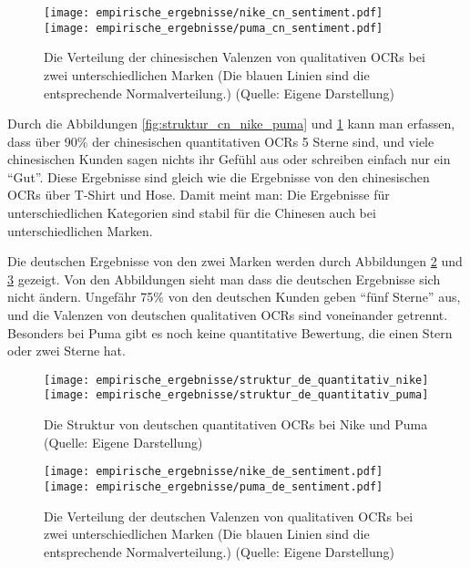\begin{figure}[h]
    \texttt{[image: empirische\_ergebnisse/nike\_cn\_sentiment.pdf]}
    \endminipage\hfill
    \texttt{[image: empirische\_ergebnisse/puma\_cn\_sentiment.pdf]}
    \endminipage 
    \caption[Die Verteilung der chinesischen Valenzen von qualitativen OCRs bei zwei unterschiedlichen Marken]{Die Verteilung der chinesischen Valenzen von qualitativen \ac{OCRs} bei zwei unterschiedlichen Marken (Die blauen Linien sind die entsprechende Normalverteilung.) (Quelle: Eigene Darstellung)}
    \label{fig:valenz_cn_marken}
\end{figure}

Durch die Abbildungen \ref{fig:struktur_cn_nike_puma} und \ref{fig:valenz_cn_marken} kann man erfassen, dass über 90\% der chinesischen quantitativen \ac{OCRs} 5 Sterne sind, und viele chinesischen Kunden sagen nichts ihr Gefühl aus oder schreiben einfach nur ein ``Gut''. Diese Ergebnisse sind gleich wie die Ergebnisse von den chinesischen \ac{OCRs} über T-Shirt und Hose. Damit meint man: Die Ergebnisse für unterschiedlichen Kategorien sind stabil für die Chinesen auch bei unterschiedlichen Marken.

Die deutschen Ergebnisse von den zwei Marken werden durch Abbildungen \ref{fig:struktur_de_nike_puma} und \ref{fig:valenz_de_marken} gezeigt. Von den Abbildungen sieht man dass die deutschen Ergebnisse sich nicht ändern. Ungefähr 75\% von den deutschen Kunden geben ``fünf Sterne'' aus, und die Valenzen von deutschen qualitativen \ac{OCRs} sind voneinander getrennt. Besonders bei Puma gibt es noch keine quantitative Bewertung, die einen Stern oder zwei Sterne hat.

\begin{figure}[htb]
    {\texttt{[image: empirische\_ergebnisse/struktur\_de\_quantitativ\_nike]}}    
    {\texttt{[image: empirische\_ergebnisse/struktur\_de\_quantitativ\_puma]}}   
    \caption[Die Struktur von deutschen quantitativen OCRs bei Nike und Puma]{Die Struktur von deutschen quantitativen \ac{OCRs} bei Nike und Puma (Quelle: Eigene Darstellung)}
    \label{fig:struktur_de_nike_puma}
\end{figure}

\begin{figure}[h]
    \texttt{[image: empirische\_ergebnisse/nike\_de\_sentiment.pdf]}
    \endminipage\hfill
    \texttt{[image: empirische\_ergebnisse/puma\_de\_sentiment.pdf]}
    \endminipage 
    \caption[Die Verteilung der deutschen Valenzen von qualitativen OCRs bei zwei unterschiedlichen Marken]{Die Verteilung der deutschen Valenzen von qualitativen \ac{OCRs} bei zwei unterschiedlichen Marken (Die blauen Linien sind die entsprechende Normalverteilung.) (Quelle: Eigene Darstellung)}
    \label{fig:valenz_de_marken}
\end{figure}


